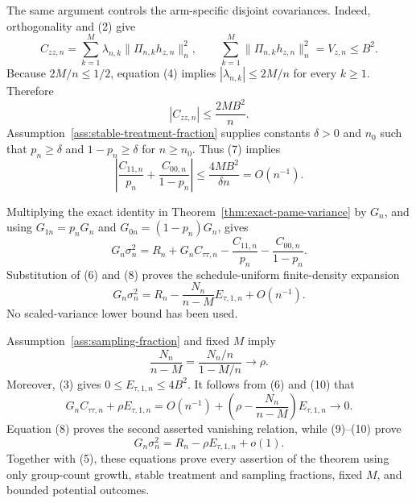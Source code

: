 The same argument controls the arm-specific disjoint covariances.  Indeed, orthogonality and (2) give
\[
C_{zz,n}
=\sum_{k=1}^M\lambda_{n,k}
  \|\Pi_{n,k}h_{z,n}\|_n^2,
\qquad
\sum_{k=1}^M\|\Pi_{n,k}h_{z,n}\|_n^2=V_{z,n}\leq B^2.
\]
Because \(2M/n\leq1/2\), equation (4) implies \(|\lambda_{n,k}|\leq2M/n\) for every \(k\geq1\).  Therefore
\[
|C_{zz,n}|\leq\frac{2MB^2}{n}.                              \tag{7}
\]
Assumption~\ref{ass:stable-treatment-fraction} supplies constants \(\delta>0\) and \(n_0\) such that \(p_n\geq\delta\) and \(1-p_n\geq\delta\) for \(n\geq n_0\).  Thus (7) implies
\[
\left|\frac{C_{11,n}}{p_n}+
       \frac{C_{00,n}}{1-p_n}\right|
\leq\frac{4MB^2}{\delta n}=O(n^{-1}).                      \tag{8}
\]

Multiplying the exact identity in Theorem~\ref{thm:exact-pame-variance} by \(G_n\), and using \(G_{1n}=p_nG_n\) and \(G_{0n}=(1-p_n)G_n\), gives
\[
G_n\sigma_n^2
=R_n+G_nC_{\tau\tau,n}
 -\frac{C_{11,n}}{p_n}-\frac{C_{00,n}}{1-p_n}.
\]
Substitution of (6) and (8) proves the schedule-uniform finite-density expansion
\[
G_n\sigma_n^2
=R_n-\frac{N_n}{n-M}E_{\tau,1,n}+O(n^{-1}).                \tag{9}
\]
No scaled-variance lower bound has been used.

Assumption~\ref{ass:sampling-fraction} and fixed \(M\) imply
\[
\frac{N_n}{n-M}
=\frac{N_n/n}{1-M/n}\longrightarrow\rho.                  \tag{10}
\]
Moreover, (3) gives \(0\leq E_{\tau,1,n}\leq4B^2\).  It follows from (6) and (10) that
\[
G_nC_{\tau\tau,n}+\rho E_{\tau,1,n}
=O(n^{-1})+
 \left(\rho-\frac{N_n}{n-M}\right)E_{\tau,1,n}
\longrightarrow0.                                         \tag{11}
\]
Equation (8) proves the second asserted vanishing relation, while (9)--(10) prove
\[
G_n\sigma_n^2=R_n-\rho E_{\tau,1,n}+o(1).
\]
Together with (5), these equations prove every assertion of the theorem using only group-count growth, stable treatment and sampling fractions, fixed \(M\), and bounded potential outcomes.

